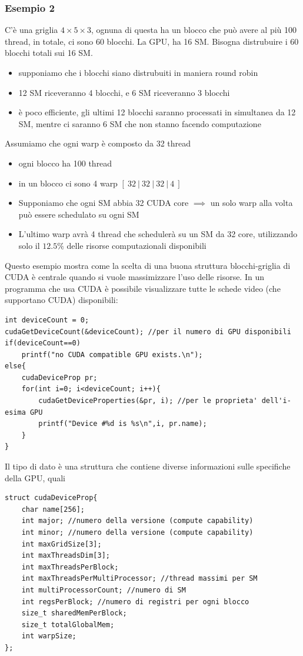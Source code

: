 \documentclass[10pt, letterpaper]{report}
\begin{document}
\subsubsection{Esempio 2}
C'è una griglia $4\times 5 \times 3$, ognuna di questa ha un blocco che può avere al più 100 thread, in totale, ci sono 60 blocchi. La GPU, ha 16 SM. Bisogna distrubuire i 60 blocchi totali sui 16 SM. \begin{itemize}
    \item supponiamo che i blocchi siano distrubuiti in maniera round robin 
    \item 12 SM riceveranno 4 blocchi, e 6 SM riceveranno 3 blocchi 
    \item è poco efficiente, gli ultimi 12 blocchi saranno processati in simultanea da 12 SM, mentre ci saranno 6 SM che non stanno facendo computazione 
\end{itemize}
Assumiamo che ogni warp è composto da 32 thread \begin{itemize}
    \item ogni blocco ha 100 thread 
    \item in un blocco ci sono 4 warp $[\ 32\ | \ 32\ | \  32\ | \  4\ ]$
    \item Supponiamo che ogni SM abbia 32 CUDA core $\implies$ un solo warp alla volta può essere schedulato su ogni SM 
    \item L'ultimo warp avrà 4 thread che schedulerà su un SM da 32 core, utilizzando solo il $12.5\%$ delle risorse computazionali disponibili 
\end{itemize}
Questo esempio mostra come la scelta di una buona struttura blocchi-griglia di CUDA è centrale quando si vuole massimizzare l'uso delle risorse. 
In un programma che usa CUDA è possibile visualizzare tutte le schede video (che supportano CUDA) disponibili:
\begin{lstlisting}[style=CStyle]
int deviceCount = 0; 
cudaGetDeviceCount(&deviceCount); //per il numero di GPU disponibili 
if(deviceCount==0)
    printf("no CUDA compatible GPU exists.\n");
else{
    cudaDeviceProp pr;
    for(int i=0; i<deviceCount; i++){
        cudaGetDeviceProperties(&pr, i); //per le proprieta' dell'i-esima GPU
        printf("Device #%d is %s\n",i, pr.name);
    }
}
\end{lstlisting}
Il tipo di dato  è una struttura che contiene diverse informazioni sulle specifiche della GPU, quali
\begin{lstlisting}[style=CStyle]
struct cudaDeviceProp{
    char name[256];
    int major; //numero della versione (compute capability)
    int minor; //numero della versione (compute capability) 
    int maxGridSize[3];
    int maxThreadsDim[3];
    int maxThreadsPerBlock;
    int maxThreadsPerMultiProcessor; //thread massimi per SM 
    int multiProcessorCount; //numero di SM 
    int regsPerBlock; //numero di registri per ogni blocco 
    size_t sharedMemPerBlock;
    size_t totalGlobalMem;
    int warpSize;
};
\end{lstlisting}
\flowerLine 
\end{document}
